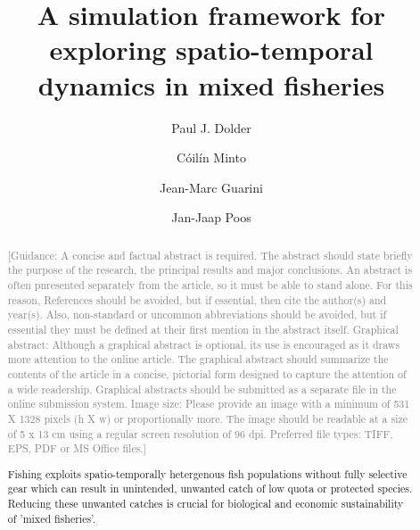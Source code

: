 \documentclass[review]{elsarticle}
\begin{document}
\begin{frontmatter}

\title{A simulation framework for exploring spatio-temporal dynamics in mixed
	fisheries}

\author[1,2]{Paul J. Dolder}

\author[1]{Cóilín Minto}
\author[3]{Jean-Marc Guarini}
\author[4]{Jan-Jaap Poos}

\address[1]{Galway-Mayo Institute of Technology (GMIT), Dublin Road, Galway,
	Ireland} 
\address[2]{Centre for Environment, Fisheries and Aquaculture Science (Cefas),
	Pakefield Road, Lowestoft, UK}
\address[3]{Université Pierre et Marie Curie, 4 Place Jussieu, 75005 Paris,
	France}
\address[4]{Wageningen Marine Research, Haringkade 1 1976 CP IJmuiden,
	Netherlands}

\begin{abstract}
\textcolor{gray}{[Guidance: A concise and factual abstract is required. The abstract 
should state briefly the purpose of the research, the principal results and
major conclusions. An abstract is often pnresented separately from the article,
so it must be able to stand alone. For this reason, References should be
avoided, but if essential, then cite the author(s) and year(s). Also,
non-standard or uncommon abbreviations should be avoided, but if essential they
must be defined at their first mention in the abstract itself.  Graphical
abstract: Although a graphical abstract is optional, its use is encouraged as
it draws more attention to the online article. The graphical abstract should
summarize the contents of the article in a concise, pictorial form designed to
capture the attention of a wide readership. Graphical abstracts should be
submitted as a separate file in the online submission system. Image size:
Please provide an image with a minimum of 531 X 1328 pixels (h X w) or
proportionally more. The image should be readable at a size of 5 x 13 cm using
a regular screen resolution of 96 dpi.  Preferred file types: TIFF, EPS, PDF or
MS Office files.] \\}

Fishing exploits spatio-temporally hetergenous fish populations without fully
selective gear which can result in unintended, unwanted catch of low quota or
protected species. Reducing these unwanted catches is crucial for biological
and economic sustainability of 'mixed fisheries'. \\


\end{abstract}
\end{frontmatter}
\end{document}
